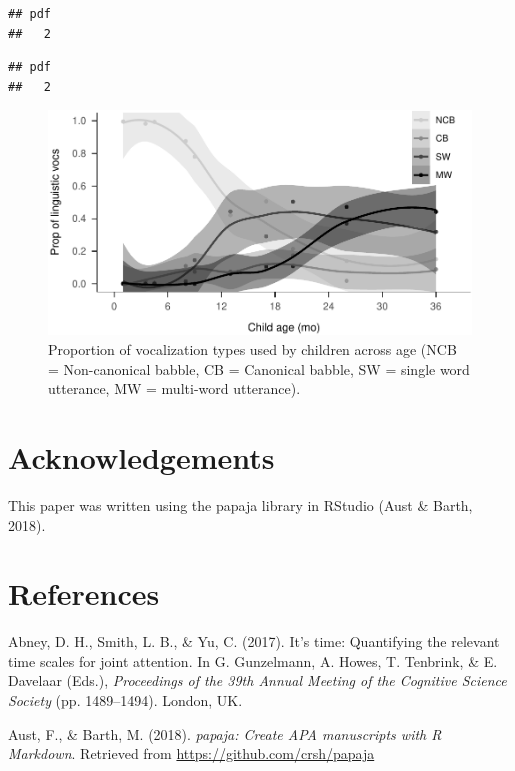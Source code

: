 \documentclass[,man,floatsintext]{apa6}
\begin{document}
\begin{verbatim}
## pdf 
##   2
\end{verbatim}

\begin{verbatim}
## pdf 
##   2
\end{verbatim}

\begin{figure}
\centering
\includegraphics{Yeli-CLE_files/figure-latex/fig6-1.pdf}
\caption{\label{fig:fig6}Proportion of vocalization types used by children
across age (NCB = Non-canonical babble, CB = Canonical babble, SW =
single word utterance, MW = multi-word utterance).}
\end{figure}

\section{Acknowledgements}\label{acknowledgements}

This paper was written using the papaja library in RStudio (Aust \&
Barth, 2018).

\newpage

\section{References}\label{refs}

\begingroup
\setlength{\parindent}{-0.5in} \setlength{\leftskip}{0.5in}

\hypertarget{refs}{}
\hypertarget{ref-abney2017time}{}
Abney, D. H., Smith, L. B., \& Yu, C. (2017). It's time: Quantifying the
relevant time scales for joint attention. In G. Gunzelmann, A. Howes, T.
Tenbrink, \& E. Davelaar (Eds.), \emph{Proceedings of the 39th Annual
Meeting of the Cognitive Science Society} (pp. 1489--1494). London, UK.

\hypertarget{ref-R-papaja}{}
Aust, F., \& Barth, M. (2018). \emph{papaja: Create APA manuscripts with
R Markdown}. Retrieved from \url{https://github.com/crsh/papaja}
\end{document}
